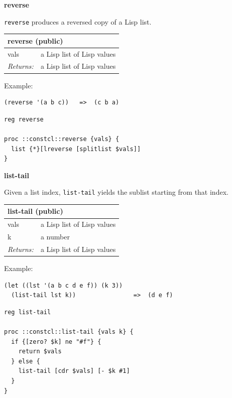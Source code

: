 \documentclass[twoside,9pt]{report}
\begin{document}
\textbf{reverse}


\texttt{reverse} produces a reversed copy of a Lisp list.

\begin{tabular}{ |l l| }
\hline
\multicolumn{2}{|l|}{reverse (public)} \\
\hline
vals & a Lisp list of Lisp values \\
\textit{Returns:} & a Lisp list of Lisp values \\
\hline
\end{tabular}


Example:

\noindent\makebox[\linewidth]{\rule{\linewidth}{0.4pt}}
\begin{lstlisting}
(reverse '(a b c))   =>  (c b a)
\end{lstlisting}
\noindent\makebox[\linewidth]{\rule{\linewidth}{0.4pt}}
\noindent\makebox[\linewidth]{\rule{\linewidth}{0.4pt}}
\begin{lstlisting}
reg reverse
 
proc ::constcl::reverse {vals} {
  list {*}[lreverse [splitlist $vals]]
}
\end{lstlisting}
\noindent\makebox[\linewidth]{\rule{\linewidth}{0.4pt}}

\textbf{list-tail}


Given a list index, \texttt{list-tail} yields the sublist starting from that index.

\begin{tabular}{ |l l| }
\hline
\multicolumn{2}{|l|}{list-tail (public)} \\
\hline
vals & a Lisp list of Lisp values \\
k & a number \\
\textit{Returns:} & a Lisp list of Lisp values \\
\hline
\end{tabular}


Example:

\noindent\makebox[\linewidth]{\rule{\linewidth}{0.4pt}}
\begin{lstlisting}
(let ((lst '(a b c d e f)) (k 3))
  (list-tail lst k))                =>  (d e f)
\end{lstlisting}
\noindent\makebox[\linewidth]{\rule{\linewidth}{0.4pt}}
\noindent\makebox[\linewidth]{\rule{\linewidth}{0.4pt}}
\begin{lstlisting}
reg list-tail
 
proc ::constcl::list-tail {vals k} {
  if {[zero? $k] ne "#f"} {
    return $vals
  } else {
    list-tail [cdr $vals] [- $k #1]
  }
}
\end{lstlisting}
\noindent\makebox[\linewidth]{\rule{\linewidth}{0.4pt}}
\end{document}
